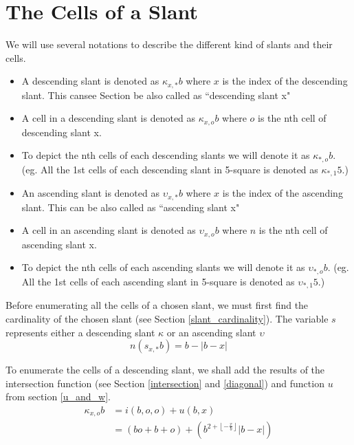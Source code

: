 \documentclass[letterpaper, twoside,12pt]{book}
\begin{document}
    \section{The Cells of a Slant} \label{cells_of_a_slant}
    We will use several notations to describe the different kind of slants and their cells.
    \begin{itemize}
        \item A descending slant is denoted as $\kappa_{x,*}b$ where $x$ is the index of the descending slant. This cansee Section be also called as ``descending slant x"
        \item A cell in a descending slant is denoted as $\kappa_{x,o}b$ where $o$ is the nth cell of descending slant x.
        \item To depict the nth cells of each descending slants we will denote it as $\kappa_{*,o}b$. (eg. All the 1st cells of each descending slant in 5-square is denoted as $\kappa_{*,1}5$.)
        \item An ascending slant is denoted as $\upsilon_{x,*}b$ where $x$ is the index of the ascending slant. This can be also called as ``ascending slant x"
        \item A cell in an ascending slant is denoted as $\upsilon_{x,o}b$ where $n$ is the nth cell of ascending slant x.
        \item To depict the nth cells of each ascending slants we will denote it as $\upsilon_{*,o}b$. (eg. All the 1st cells of each ascending slant in 5-square is denoted as $\upsilon_{*,1}5$.)
    \end{itemize}

    Before enumerating all the cells of a chosen slant, we must first find the cardinality of the chosen slant (see Section \ref{slant_cardinality}). The variable $s$ represents either a descending slant $\kappa$ or an ascending slant $\upsilon$
    \begin{equation}
        n(s_{x,*}b) = b - |b-x|
    \end{equation}


    To enumerate the cells of a descending slant, we shall add the results of the intersection function (see Section \ref{intersection} and \ref{diagonal}) and function $u$ from section \ref{u_and_w}.
    \begin{equation}
        \begin{split}
            \kappa_{x,o}b &= i(b,o,o) + u(b,x) \\
                &= (bo + b + o) + (b^{2 + \left\lfloor -\frac{x}{b} \right\rfloor }|b-x|)
        \end{split}
    \end{equation}
\end{document}

